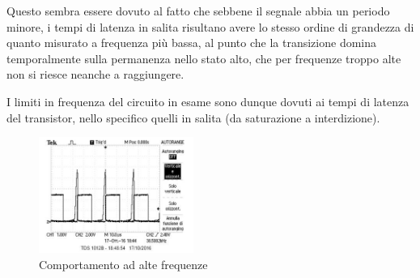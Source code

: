 \documentclass[10pt,a4paper]{article}
\begin{document}
Questo sembra essere dovuto al fatto che sebbene il segnale abbia un periodo minore, i tempi di latenza in salita risultano avere lo stesso ordine di grandezza di quanto misurato a frequenza più bassa, al punto che la transizione domina temporalmente sulla permanenza nello stato alto, che per frequenze troppo alte non si riesce neanche a raggiungere.

I limiti in frequenza del circuito in esame sono dunque dovuti ai tempi di latenza del transistor, nello specifico quelli in salita (da saturazione a interdizione).

\begin{figure}[h!]
\centering
\includegraphics[width=0.45\textwidth]{../oscilloscopio/raise_problem.jpg}
\caption{Comportamento ad alte frequenze}
\end{figure}
\end{document}
